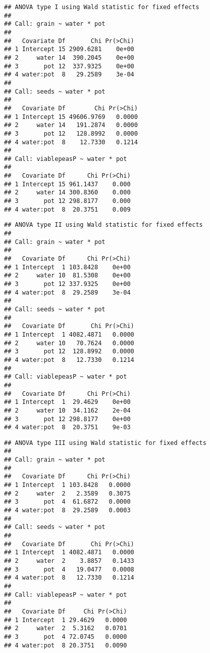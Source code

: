 \begin{knitrout}
\color{fgcolor}\begin{kframe}
\begin{alltt}
\end{alltt}
\begin{verbatim}
## ANOVA type I using Wald statistic for fixed effects
## 
## Call: grain ~ water * pot
## 
##   Covariate Df       Chi Pr(>Chi)
## 1 Intercept 15 2909.6281    0e+00
## 2     water 14  390.2045    0e+00
## 3       pot 12  337.9325    0e+00
## 4 water:pot  8   29.2589    3e-04
## 
## Call: seeds ~ water * pot
## 
##   Covariate Df        Chi Pr(>Chi)
## 1 Intercept 15 49606.9769   0.0000
## 2     water 14   191.2874   0.0000
## 3       pot 12   128.8992   0.0000
## 4 water:pot  8    12.7330   0.1214
## 
## Call: viablepeasP ~ water * pot
## 
##   Covariate Df      Chi Pr(>Chi)
## 1 Intercept 15 961.1437    0.000
## 2     water 14 300.8360    0.000
## 3       pot 12 298.8177    0.000
## 4 water:pot  8  20.3751    0.009
\end{verbatim}
\begin{alltt}
\end{alltt}
\begin{verbatim}
## ANOVA type II using Wald statistic for fixed effects
## 
## Call: grain ~ water * pot
## 
##   Covariate Df      Chi Pr(>Chi)
## 1 Intercept  1 103.8428    0e+00
## 2     water 10  81.5308    0e+00
## 3       pot 12 337.9325    0e+00
## 4 water:pot  8  29.2589    3e-04
## 
## Call: seeds ~ water * pot
## 
##   Covariate Df       Chi Pr(>Chi)
## 1 Intercept  1 4082.4871   0.0000
## 2     water 10   70.7624   0.0000
## 3       pot 12  128.8992   0.0000
## 4 water:pot  8   12.7330   0.1214
## 
## Call: viablepeasP ~ water * pot
## 
##   Covariate Df      Chi Pr(>Chi)
## 1 Intercept  1  29.4629    0e+00
## 2     water 10  34.1162    2e-04
## 3       pot 12 298.8177    0e+00
## 4 water:pot  8  20.3751    9e-03
\end{verbatim}
\begin{alltt}
\end{alltt}
\begin{verbatim}
## ANOVA type III using Wald statistic for fixed effects
## 
## Call: grain ~ water * pot
## 
##   Covariate Df      Chi Pr(>Chi)
## 1 Intercept  1 103.8428   0.0000
## 2     water  2   2.3589   0.3075
## 3       pot  4  61.6872   0.0000
## 4 water:pot  8  29.2589   0.0003
## 
## Call: seeds ~ water * pot
## 
##   Covariate Df       Chi Pr(>Chi)
## 1 Intercept  1 4082.4871   0.0000
## 2     water  2    3.8857   0.1433
## 3       pot  4   19.0477   0.0008
## 4 water:pot  8   12.7330   0.1214
## 
## Call: viablepeasP ~ water * pot
## 
##   Covariate Df     Chi Pr(>Chi)
## 1 Intercept  1 29.4629   0.0000
## 2     water  2  5.3162   0.0701
## 3       pot  4 72.0745   0.0000
## 4 water:pot  8 20.3751   0.0090
\end{verbatim}
\end{kframe}
\end{knitrout}

